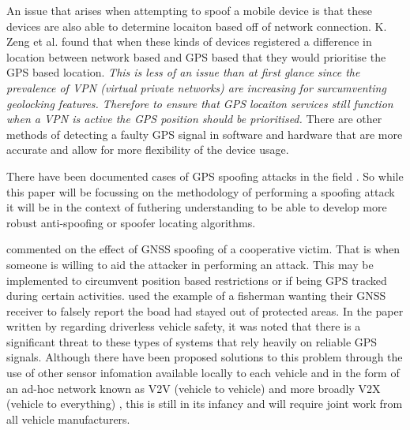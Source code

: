 \medskip

An issue that arises when attempting to spoof a mobile device is that these devices are also able to determine locaiton based off of
network connection. 
K. Zeng et al. \cite{RN9} found that when these kinds of devices registered a difference in location between network based and GPS based
that they would prioritise the GPS based location. \emph{This is less of an issue than at first glance since the prevalence of VPN (virtual private networks)
are increasing for surcumventing geolocking features. Therefore to ensure that GPS locaiton services still function when a VPN is active
the GPS position should be prioritised.} There are other methods of detecting a faulty GPS signal in software and hardware that are
more accurate and allow for more flexibility of the device usage. 

\medskip

There have been documented cases of GPS spoofing attacks in the field . So while this paper 
will be focussing on the methodology of performing a spoofing attack it will be in the context of futhering understanding to be able to develop 
more robust anti-spoofing or spoofer locating algorithms.

\bigskip

\citeauthor{RN12} \cite{RN12} commented on the effect of GNSS spoofing of a cooperative victim. That is when someone is willing to aid the attacker
in performing an attack. This may be implemented to circumvent position based restrictions or if being GPS tracked during certain activities.
\citeauthor{RN12} used the example of a fisherman wanting their GNSS receiver to falsely report the boad had stayed out of protected areas.
In the paper written by \citeauthor{RN25} \cite{RN25} regarding driverless vehicle safety, it was noted that there is a significant threat to these types
of systems that rely heavily on reliable GPS signals. Although there have been proposed solutions to this problem through the use of 
other sensor infomation available locally to each vehicle and in the form of an ad-hoc network known as V2V (vehicle to vehicle) and more broadly
V2X (vehicle to everything) \cite{RN17}, this is still in its infancy and will require joint work from all vehicle manufacturers.   

\bigskip

